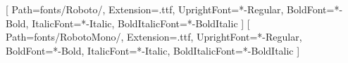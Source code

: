 \usepackage{fontspec}
\setmainfont{Roboto}

\newif\ifxetexorluatex
\ifx\XeTeXrevision\undefined
  \ifx\directlua\undefined
    \xetexorluatexfalse
  \else
    \xetexorluatextrue  %
  \fi
\else
  \xetexorluatextrue    %
\fi

\ifxetexorluatex
  \usepackage{fontspec}
  \newfontfamily{}[
    Path=fonts/Roboto/, Extension=.ttf,
    UprightFont=*-Regular, BoldFont=*-Bold,
    ItalicFont=*-Italic, BoldItalicFont=*-BoldItalic
  ]
  \newfontfamily{}[
    Path=fonts/RobotoMono/, Extension=.ttf,
    UprightFont=*-Regular, BoldFont=*-Bold,
    ItalicFont=*-Italic, BoldItalicFont=*-BoldItalic
  ]
  \setmainfont{Roboto}      %
  \setsansfont{Roboto}      %
  \setmonofont{RobotoMono}  %
\else
  \usepackage[T1]{fontenc}
  \usepackage[utf8]{inputenc}
  \usepackage{lmodern}      %
\fi
